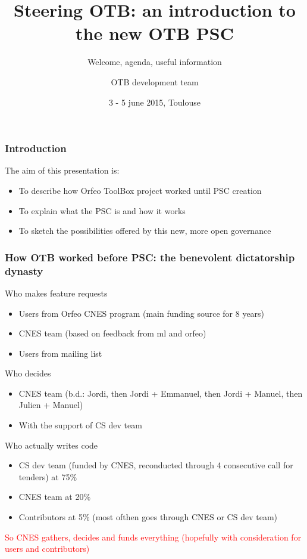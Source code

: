 \documentclass[8pt]{beamer}
\title{Steering OTB: an introduction to the new OTB PSC}
\subtitle{Welcome, agenda, useful information}
\author{OTB development team}%
\date{3 - 5 june 2015, Toulouse}
\begin{document}
\begin{frame}
\titlepage
\end{frame}

\begin{frame}
\frametitle{Introduction}
The aim of this presentation is:
\begin{itemize}
\item To describe how Orfeo ToolBox project worked until PSC creation
\item To explain what the PSC is and how it works
\item To sketch the possibilities offered by this new, more open governance
\end{itemize}

\end{frame}

\begin{frame}
\frametitle{How OTB worked before PSC: the benevolent dictatorship dynasty}
\begin{block}{Who makes feature requests}
\begin{itemize}
\item Users from Orfeo CNES program (main funding source for 8 years)
\item CNES team (based on feedback from ml and orfeo)
\item Users from mailing list
\end{itemize}
\end{block}

\begin{block}{Who decides}
\begin{itemize}
\item CNES team (b.d.: Jordi, then Jordi + Emmanuel, then Jordi + Manuel, then Julien + Manuel)
\item With the support of CS dev team
\end{itemize}
\end{block}

\begin{block}{Who actually writes code}
\begin{itemize}
\item CS dev team (funded by CNES, reconducted through 4 consecutive call for tenders) at 75\%
\item CNES team at 20\%
\item Contributors at 5\% (most ofthen goes through CNES or CS dev team)
\end{itemize}
\end{block}

\textcolor{red}{So CNES gathers, decides and funds everything (hopefully with consideration for users and contributors)}

\end{frame}
\end{document}
